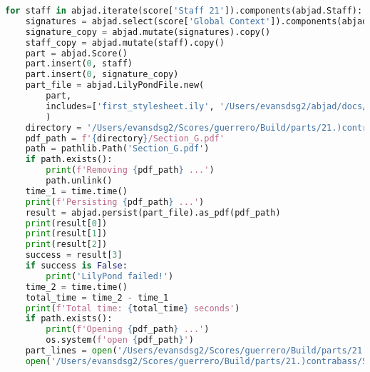 \begin{lstlisting}[language=Python, caption=Invocation Source Code]
for staff in abjad.iterate(score['Staff 21']).components(abjad.Staff):
    signatures = abjad.select(score['Global Context']).components(abjad.Staff)
    signature_copy = abjad.mutate(signatures).copy()
    staff_copy = abjad.mutate(staff).copy()
    part = abjad.Score()
    part.insert(0, staff)
    part.insert(0, signature_copy)
    part_file = abjad.LilyPondFile.new(
        part,
        includes=['first_stylesheet.ily', '/Users/evansdsg2/abjad/docs/source/_stylesheets/abjad.ily'],
        )
    directory = '/Users/evansdsg2/Scores/guerrero/Build/parts/21.)contrabass'
    pdf_path = f'{directory}/Section_G.pdf'
    path = pathlib.Path('Section_G.pdf')
    if path.exists():
        print(f'Removing {pdf_path} ...')
        path.unlink()
    time_1 = time.time()
    print(f'Persisting {pdf_path} ...')
    result = abjad.persist(part_file).as_pdf(pdf_path)
    print(result[0])
    print(result[1])
    print(result[2])
    success = result[3]
    if success is False:
        print('LilyPond failed!')
    time_2 = time.time()
    total_time = time_2 - time_1
    print(f'Total time: {total_time} seconds')
    if path.exists():
        print(f'Opening {pdf_path} ...')
        os.system(f'open {pdf_path}')
    part_lines = open('/Users/evansdsg2/Scores/guerrero/Build/parts/21.)contrabass/Section_G.ly').readlines()
    open('/Users/evansdsg2/Scores/guerrero/Build/parts/21.)contrabass/Section_G.ly', 'w').writelines(part_lines[15:-1])
\end{lstlisting}
